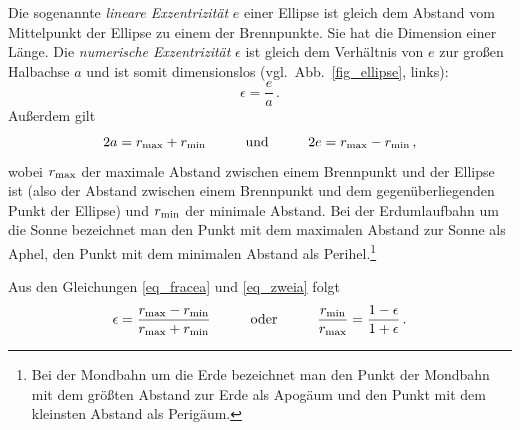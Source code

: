 Die sogenannte \textit{lineare Exzentrizit\"at} $e$ 
einer Ellipse ist gleich dem Abstand vom 
Mittelpunkt der Ellipse zu einem der Brennpunkte. Sie hat die Dimension einer L\"ange. 
Die \textit{numerische Exzentrizit\"at} 
$\epsilon$ ist gleich dem Verh\"altnis von $e$ zur gro\ss en
Halbachse $a$ und ist somit dimensionslos (vgl.\ Abb.\ \ref{fig_ellipse}, links):
\begin{equation}
\label{eq_fracea}
               \epsilon = \frac{e}{a} \, .
\end{equation}
Au\ss erdem gilt
\begin{equation}
\label{eq_zweia}
             2a = r_{\rm max} + r_{\rm min}  \hspace{1cm} {\rm und} \hspace{1cm}
             2e = r_{\rm max} - r_{\rm min}   \, ,
\end{equation}
wobei $r_{\rm max}$ der maximale Abstand zwischen einem Brennpunkt und der Ellipse ist (also der
Abstand zwischen einem Brennpunkt und dem gegen\"uberliegenden Punkt der Ellipse) und $r_{\rm min}$
der minimale Abstand. Bei der Erdumlaufbahn um die Sonne bezeichnet man den Punkt mit dem
maximalen Abstand zur Sonne als Aphel, 
den Punkt mit dem minimalen Abstand als Perihel.\footnote{Bei der Mondbahn 
um die Erde bezeichnet man den Punkt der Mondbahn mit dem gr\"o\ss ten 
Abstand zur Erde als Apog\"aum 
und den Punkt mit dem kleinsten Abstand als Perig\"aum.} 
 
Aus den Gleichungen \ref{eq_fracea} und \ref{eq_zweia} folgt
\begin{equation}
               \epsilon = \frac{r_{\rm max} - r_{\rm min}}{r_{\rm max} + r_{\rm min}}
               \hspace{1cm}  {\rm oder}  \hspace{1cm}   \frac{r_{\rm min}}{r_{\rm max}} = 
               \frac{1-\epsilon}{1+\epsilon}         \, .
\end{equation}

